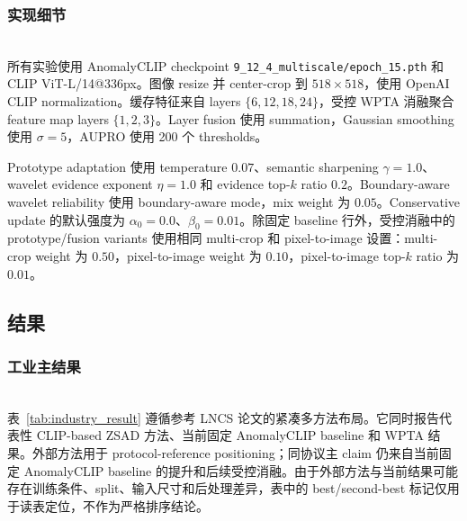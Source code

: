 \documentclass[runningheads]{llncs}
\begin{document}
\subsubsection{实现细节}
\mbox{}\\
\noindent
所有实验使用 AnomalyCLIP checkpoint \texttt{9\_12\_4\_multiscale/epoch\_15.pth} 和 CLIP ViT-L/14@336px。图像 resize 并 center-crop 到 $518\times518$，使用 OpenAI CLIP normalization。缓存特征来自 layers $\{6,12,18,24\}$，受控 WPTA 消融聚合 feature map layers $\{1,2,3\}$。Layer fusion 使用 summation，Gaussian smoothing 使用 $\sigma=5$，AUPRO 使用 200 个 thresholds。

Prototype adaptation 使用 temperature $0.07$、semantic sharpening $\gamma=1.0$、wavelet evidence exponent $\eta=1.0$ 和 evidence top-$k$ ratio $0.2$。Boundary-aware wavelet reliability 使用 boundary-aware mode，mix weight 为 $0.05$。Conservative update 的默认强度为 $\alpha_0=0.0$、$\beta_0=0.01$。除固定 baseline 行外，受控消融中的 prototype/fusion variants 使用相同 multi-crop 和 pixel-to-image 设置：multi-crop weight 为 $0.50$，pixel-to-image weight 为 $0.10$，pixel-to-image top-$k$ ratio 为 $0.01$。

\subsection{结果}

\subsubsection{工业主结果}
\mbox{}\\
\noindent
表~\ref{tab:industry_result} 遵循参考 LNCS 论文的紧凑多方法布局。它同时报告代表性 CLIP-based ZSAD 方法、当前固定 AnomalyCLIP baseline 和 WPTA 结果。外部方法用于 protocol-reference positioning；同协议主 claim 仍来自当前固定 AnomalyCLIP baseline 的提升和后续受控消融。由于外部方法与当前结果可能存在训练条件、split、输入尺寸和后处理差异，表中的 best/second-best 标记仅用于读表定位，不作为严格排序结论。
\end{document}
